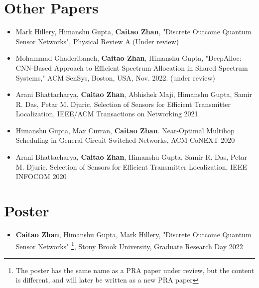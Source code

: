 \section*{Other Papers}
\begin{itemize}

    \item Mark Hillery, Himanshu Gupta, \textbf{Caitao Zhan}, "Discrete Outcome Quantum Sensor Networks", Physical Review A (Under review)

    \item Mohammad Ghaderibaneh, \textbf{Caitao Zhan}, Himanshu Gupta, "DeepAlloc: CNN-Based Approach to Efficient Spectrum Allocation in Shared Spectrum Systems," ACM SenSys, Boston, USA, Nov. 2022. (under review)

    \item Arani Bhattacharya, \textbf{Caitao Zhan}, Abhishek Maji, Himanshu Gupta, Samir R. Das, Petar M. Djuric, Selection of Sensors for Efficient Transmitter Localization, IEEE/ACM Transactions on Networking 2021.

    \item Himanshu Gupta, Max Curran, \textbf{Caitao Zhan}. Near-Optimal Multihop Scheduling in General Circuit-Switched Networks, ACM CoNEXT 2020
    
    \item Arani Bhattacharya, \textbf{Caitao Zhan}, Himanshu Gupta, Samir R. Das, Petar M. Djuric. Selection of Sensors for Efficient Transmitter Localization, IEEE INFOCOM 2020
  
\end{itemize}

\section*{Poster}
\begin{itemize}

    \item \textbf{Caitao Zhan}, Himanshu Gupta, Mark Hillery, "Discrete Outcome Quantum Sensor Networks"
    \footnote{The poster has the same name as a PRA paper under review, but the content is different, and will later be written as a new PRA paper}, Stony Brook University, Graduate Research Day 2022
  
\end{itemize}